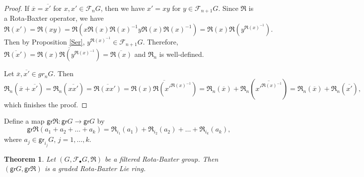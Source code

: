 \documentclass[12pt]{amsart}
\newtheorem{thm}{Theorem}[section]
\theoremstyle{definition}   %
\newcommand{\gr}{\mathsf{gr}}
\newcommand{\huaF}{\mathcal{F}}
\newcommand{\frkR}{\mathfrak R}
\begin{document}
\begin{proof}
If $\overline{x}=\overline{x'}$ for $x,x'\in \huaF_nG$, then we have $x'=xy$ for $y\in \huaF_{n+1}G$. Since $\frkR$ is a Rota-Baxter operator, we have
$$
\frkR(x')=\frkR(xy)=\frkR(x\frkR(x)\frkR(x)^{-1}y\frkR(x)\frkR(x)^{-1})=\frkR(x)\frkR(y^{\frkR(x)^{-1}}).
$$
Then by Proposition \ref{Ser}, $y^{\frkR(x)^{-1}}\in \huaF_{n+1}G$. Therefore, $ \overline{\frkR(x')}=\overline{\frkR(x)\frkR(y^{\frkR(x)^{-1}})}=\overline{\frkR(x)}$ and $\frkR_n$ is well-defined.


Let $\overline{x},\overline{x'}\in gr_nG$. Then
$$
\frkR_n(\overline{x}+\overline{x'})=\frkR_n(\overline{xx'})=\overline{\frkR(xx')}=\overline{\frkR(x)\frkR\left({x'}^{\frkR(x)^{-1}}\right)}
=\frkR_n(\overline{x})+\frkR_n\left(\overline{{x'}^{\frkR(x)^{-1}}}\right)=\frkR_n(\overline{x})+\frkR_n(\overline{x'}),
$$
which finishes the proof.
\end{proof}


    Define a map $\gr\frkR:\gr G\rightarrow \gr G$ by
  \begin{equation}\label{defRBGr}
    \gr\frkR(a_1+a_2+\ldots +a_k)=\frkR_{i_1}(a_1)+\frkR_{i_2}(a_2)+\ldots+\frkR_{i_k}(a_k),
\end{equation}
    where $a_j\in \gr_{i_j}G$, $j=1,\ldots,k$.


\begin{thm}\label{thm:grring} Let $(G,\huaF_{\bullet}G,\frkR)$ be a filtered Rota-Baxter group. Then $(\gr G,\gr\frkR)$ is a graded Rota-Baxter Lie ring.
\end{thm}
\end{document}
